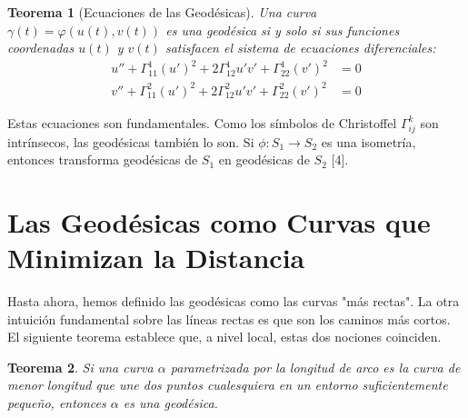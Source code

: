 \documentclass[12pt, a4paper]{report}
\theoremstyle{miestilo}
\newtheorem{teorema}{Teorema}[chapter]
\theoremstyle{midefinicion}
\begin{document}
\begin{teorema}[Ecuaciones de las Geodésicas]
Una curva $\gamma(t) = \varphi(u(t), v(t))$ es una geodésica si y solo si sus funciones coordenadas $u(t)$ y $v(t)$ satisfacen el sistema de ecuaciones diferenciales:
\begin{align*}
u'' + \Gamma_{11}^1 (u')^2 + 2\Gamma_{12}^1 u'v' + \Gamma_{22}^1 (v')^2 &= 0 \\
v'' + \Gamma_{11}^2 (u')^2 + 2\Gamma_{12}^2 u'v' + \Gamma_{22}^2 (v')^2 &= 0
\end{align*}
\end{teorema}

Estas ecuaciones son fundamentales. Como los símbolos de Christoffel $\Gamma_{ij}^k$ son intrínsecos, las geodésicas también lo son. Si $\phi: S_1 \to S_2$ es una isometría, entonces transforma geodésicas de $S_1$ en geodésicas de $S_2$ [4].

\section{Las Geodésicas como Curvas que Minimizan la Distancia}

Hasta ahora, hemos definido las geodésicas como las curvas "más rectas". La otra intuición fundamental sobre las líneas rectas es que son los caminos más cortos. El siguiente teorema establece que, a nivel local, estas dos nociones coinciden.

\begin{teorema}
Si una curva $\alpha$ parametrizada por la longitud de arco es la curva de menor longitud que une dos puntos cualesquiera en un entorno suficientemente pequeño, entonces $\alpha$ es una geodésica.
\end{teorema}
\end{document}
